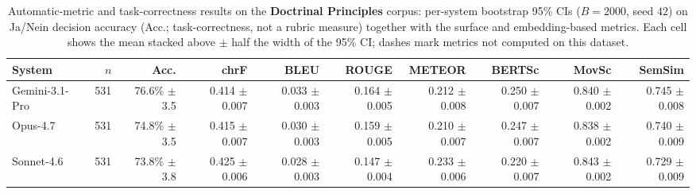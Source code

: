 \begin{table}[t]
\centering\footnotesize
\caption{Automatic-metric and task-correctness results on the \textbf{Doctrinal Principles} corpus: per-system bootstrap 95\% CIs ($B=2000$, seed $42$) on Ja/Nein decision accuracy (Acc.; task-correctness, not a rubric measure) together with the surface and embedding-based metrics. Each cell shows the mean stacked above $\pm$ half the width of the 95\% CI; dashes mark metrics not computed on this dataset.}
\label{tbl-full-results-auto-grundpr}
\setlength{\tabcolsep}{4pt}
\begin{tabular*}{\textwidth}{@{\extracolsep{\fill}}lrrrrrrrrr@{}}
\toprule
System & $n$ & Acc. & chrF & BLEU & ROUGE & METEOR & BERTSc & MovSc & SemSim \\
\midrule
Gemini-3.1-Pro & 531 & \shortstack[r]{76.6\%\\{\scriptsize $\pm$3.5}} & \shortstack[r]{0.414\\{\scriptsize $\pm$0.007}} & \shortstack[r]{0.033\\{\scriptsize $\pm$0.003}} & \shortstack[r]{0.164\\{\scriptsize $\pm$0.005}} & \shortstack[r]{0.212\\{\scriptsize $\pm$0.008}} & \shortstack[r]{0.250\\{\scriptsize $\pm$0.007}} & \shortstack[r]{0.840\\{\scriptsize $\pm$0.002}} & \shortstack[r]{0.745\\{\scriptsize $\pm$0.008}} \\
Opus-4.7 & 531 & \shortstack[r]{74.8\%\\{\scriptsize $\pm$3.5}} & \shortstack[r]{0.415\\{\scriptsize $\pm$0.007}} & \shortstack[r]{0.030\\{\scriptsize $\pm$0.003}} & \shortstack[r]{0.159\\{\scriptsize $\pm$0.005}} & \shortstack[r]{0.210\\{\scriptsize $\pm$0.007}} & \shortstack[r]{0.247\\{\scriptsize $\pm$0.007}} & \shortstack[r]{0.838\\{\scriptsize $\pm$0.002}} & \shortstack[r]{0.740\\{\scriptsize $\pm$0.009}} \\
Sonnet-4.6 & 531 & \shortstack[r]{73.8\%\\{\scriptsize $\pm$3.8}} & \shortstack[r]{0.425\\{\scriptsize $\pm$0.006}} & \shortstack[r]{0.028\\{\scriptsize $\pm$0.003}} & \shortstack[r]{0.147\\{\scriptsize $\pm$0.004}} & \shortstack[r]{0.233\\{\scriptsize $\pm$0.006}} & \shortstack[r]{0.220\\{\scriptsize $\pm$0.007}} & \shortstack[r]{0.843\\{\scriptsize $\pm$0.002}} & \shortstack[r]{0.729\\{\scriptsize $\pm$0.009}} \\

\end{tabular*}
\end{table}
